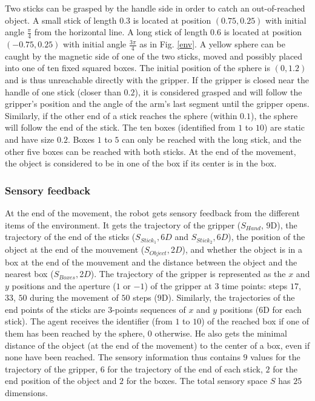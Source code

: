 \documentclass[10pt,letterpaper]{article}
\begin{document}
			Two sticks can be grasped by the handle side in order to catch an out-of-reached object.
			A small stick of length $0.3$ is located at position $(0.75, 0.25)$ with initial angle $\frac{\pi}{4}$ from the horizontal line.
			A long stick of length $0.6$ is located at position $(-0.75, 0.25)$ with initial angle $\frac{3\pi}{4}$ as in Fig. \ref{env}.	
			A yellow sphere can be caught by the magnetic side of one of the two sticks, moved and possibly placed into one of ten fixed squared boxes. 
			The initial position of the sphere is $(0, 1.2)$ and is thus unreachable directly with the gripper.		
			If the gripper is closed near the handle of one stick (closer than $0.2$), it is considered grasped and will follow the gripper's position and the angle of the arm's last segment until the gripper opens.			
			Similarly, if the other end of a stick reaches the sphere (within $0.1$), the sphere will follow the end of the stick.
			The ten boxes (identified from $1$ to $10$) are static and have size $0.2$.
			Boxes $1$ to $5$ can only be reached with the long stick, and the other five boxes can be reached with both sticks.
			At the end of the movement, the object is considered to be in one of the box if its center is in the box.
		
		
		\subsubsection{Sensory feedback}
		
			At the end of the movement, the robot gets sensory feedback from the different items of the environment.
			It gets the trajectory of the gripper ($S_{Hand}$, $9$D), the trajectory of the end of the sticks ($S_{Stick_1}, $6$D$ and $S_{Stick_2}, $6$D$), 
			the position of the object at the end of the mouvement ($S_{Object}, $2$D$), and whether the object is in a box at the end of the mouvement and the distance between the object and the nearest box ($S_{Boxes}, $2$D$).		
			The trajectory of the gripper is represented as the $x$ and $y$ positions and the aperture ($1$ or $-1$) of the gripper at $3$ time points: 
			steps $17$, $33$, $50$ during the movement of $50$ steps ($9$D).
			Similarly, the trajectories of the end points of the sticks are $3$-points sequences of $x$ and $y$ positions ($6$D for each stick).
			The agent receives the identifier (from $1$ to $10$) of the reached box if one of them has been reached by the sphere, 0 otherwise. 
			He also gets the minimal distance of the object (at the end of the movement) to the center of a box, even if none have been reached.			 
			The sensory information thus contains $9$ values for the trajectory of the gripper, $6$ for the trajectory of the end of each stick, $2$ for the end position of the object and $2$ for the boxes.
			The total sensory space $S$ has $25$ dimensions.
			
\end{document}
